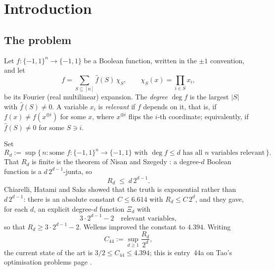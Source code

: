\documentclass[11pt,reqno]{amsart}
\theoremstyle{plain}
\theoremstyle{definition}
\numberwithin{theorem}{section}
\newcommand{\cube}{\{-1,1\}}
\newcommand{\Fhat}[1]{\widehat{#1}}
\newcommand{\XiC}{\Xi}
\DeclareMathOperator{\Deg}{deg}
\begin{document}
\maketitle

\section{Introduction}\label{sec:intro}

\subsection{The problem}
Let $f \colon \cube^n \to \cube$ be a Boolean function, written in the $\pm 1$ convention, and
let
\[
  f = \sum_{S \subseteq [n]} \Fhat{f}(S)\, \chi_S,
  \qquad \chi_S(x) = \prod_{i \in S} x_i,
\]
be its Fourier (real multilinear) expansion. The \emph{degree} $\Deg f$ is the largest $|S|$
with $\Fhat{f}(S) \ne 0$. A variable $x_i$ is \emph{relevant} if $f$ depends on it, that is,
if $f(x) \ne f(x^{\oplus i})$ for some $x$, where $x^{\oplus i}$ flips the $i$-th coordinate;
equivalently, if $\Fhat{f}(S) \ne 0$ for some $S \ni i$.

Set
\[
  R_d := \sup \{\, n : \text{some } f \colon \cube^n \to \cube \text{ with } \Deg f \le d
  \text{ has all } n \text{ variables relevant} \,\}.
\]
That $R_d$ is finite is the theorem of Nisan and Szegedy \cite{NS94}: a degree-$d$ Boolean
function is a $d\,2^{d-1}$-junta, so
\begin{equation}\label{eq:ns}
  R_d \;\le\; d\,2^{d-1}.
\end{equation}
Chiarelli, Hatami and Saks \cite{CHS20} showed that the truth is exponential rather than
$d\,2^{d-1}$: there is an absolute constant $C \le 6.614$ with $R_d \le C\, 2^d$, and they
gave, for each $d$, an explicit degree-$d$ function $\XiC_d$ with
\begin{equation}\label{eq:chslower}
  3 \cdot 2^{d-1} - 2 \quad \text{relevant variables},
\end{equation}
so that $R_d \ge 3 \cdot 2^{d-1} - 2$. Wellens \cite{Wel22} improved the constant to $4.394$.
Writing
\[
  C_{44} := \sup_{d \ge 1} \frac{R_d}{2^d},
\]
the current state of the art is $3/2 \le C_{44} \le 4.394$; this is entry~44a on Tao's
optimisation problems page \cite{TaoOP44a}.
\end{document}
